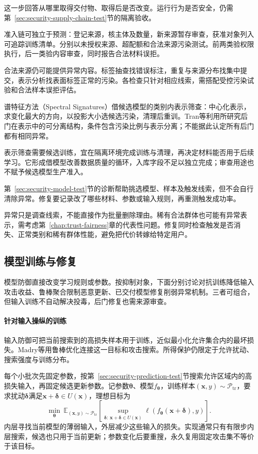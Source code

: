 这一步回答从哪里取得交付物、取得后是否改变。运行行为是否安全，仍需第~\ref{sec:security-supply-chain-test}节的隔离验收。

准入链可独立于预测：登记来源，核主体及数量，新来源暂存审查，获准对象列入可追踪训练清单。分别以未授权来源、超配额和合法来源污染测试。前两类验权限执行，后一类验内容审查，同时报告合法材料误拒。

合法来源仍可能提供异常内容。标签抽查找错误标注，重复与来源分布找集中提交，表示分析找表面标签正常的污染。各检查只针对相应线索，需搭配受控污染试验和合法样本误拒评估。

谱特征方法（Spectral Signatures）借候选模型的类别内表示筛查：中心化表示，求变化最大的方向，以投影大小选候选污染，清理后重训。Tran等利用所研究后门在表示中的可分离结构，条件包含污染比例与表示分离；不能据此认定所有后门都有相同异常。

表示筛查需要候选训练，宜在隔离环境完成训练与清理，再决定材料能否用于后续学习。它形成借模型改善数据质量的循环，入库字段不足以独立完成；审查用途也不赋予候选模型生产准入。

第~\ref{sec:security-model-test}节的诊断帮助挑选模型、样本及触发线索，但不会自行清除异常。修复要记录改了哪些材料、参数或输入规则，再重测触发成功率。

异常只是调查线索，不能直接作为批量删除理由。稀有合法群体也可能有异常表示，需考虑第~\ref{chap:trust-fairness}章的代表性问题。修复同时检查触发是否消失、正常类别和稀有群体性能，避免把代价转嫁给特定用户。

\subsection{模型训练与修复}
\label{sec:security-prediction-defense}
\label{sec:security-model-defense}

模型防御直接改变学习规则或参数。按抑制对象，下面分别讨论对抗训练降低输入攻击收益、鲁棒聚合限制恶意更新、已交付模型修复削弱异常机制。三者可组合，但输入训练不自动解决投毒，后门修复也需来源审查。

\paragraph{针对输入操纵的训练}

输入防御可把当前搜索到的高损失样本用于训练，近似最小化允许集合内的最坏损失。Madry等用鲁棒优化连接这一目标和攻击搜索。所得保护仍限定于允许扰动、搜索强度与训练分布。

每个小批次先固定参数，按第~\ref{sec:security-prediction-test}节搜索允许区域内的高损失输入，再固定候选更新参数。记参数$\bm\theta$、模型$f_{\bm\theta}$，训练样本$(\bm x,y)\sim\mathcal P_{\mathrm{tr}}$，要求扰动$\bm\delta$满足$\bm x+\bm\delta\in U(\bm x)$，理想目标为
\begin{equation}
 \min_{\bm\theta}\ \mathbb E_{(\bm x,y)\sim\mathcal P_{\mathrm{tr}}}
 \left[\sup_{\bm\delta:\,\bm x+\bm\delta\in U(\bm x)}
  \ell(f_{\bm\theta}(\bm x+\bm\delta),y)\right].
 \label{eq:security-adversarial-training}
\end{equation}
内层寻找当前模型的薄弱输入，外层减少这些输入的损失。实现通常只有有限步内层搜索，候选也只用于当前更新；参数变化后要重搜，永久复用固定攻击集不等价于该目标。


